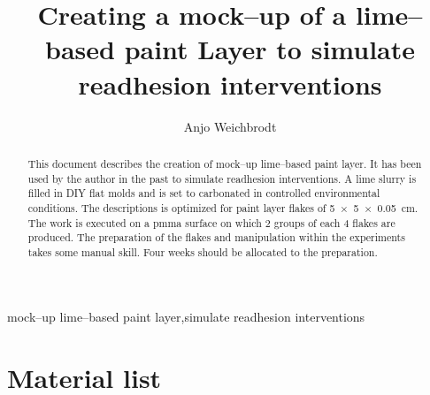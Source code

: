 \documentclass[review]{elsarticle}
\begin{document}
\begin{frontmatter}

\title{Creating a mock--up of a lime--based paint Layer to simulate readhesion interventions}

\author{Anjo Weichbrodt}

\address{anjo.weichbrodt@gmail.com}

%
%


\glsunsetall{} %

\begin{abstract}
This document describes the creation of mock--up lime--based paint layer.
It has been used by the author in the past to simulate readhesion interventions.
A lime slurry is filled in DIY flat molds and is set to carbonated in controlled environmental conditions.
The descriptions is optimized for paint layer flakes of \SI[product-units = single]{5 x 5 x 0.05}{\cm}.
The work is executed on a \gls{pmma} surface on which 2 groups of each 4 flakes are produced.
The preparation of the flakes and manipulation within the experiments takes some manual skill.
Four weeks should be allocated to the preparation.
\end{abstract}

\begin{keyword}
{mock--up lime--based paint layer}\sep{simulate readhesion interventions}
\end{keyword}

\end{frontmatter}

\linenumbers{}

\section{Material list}
\end{document}
